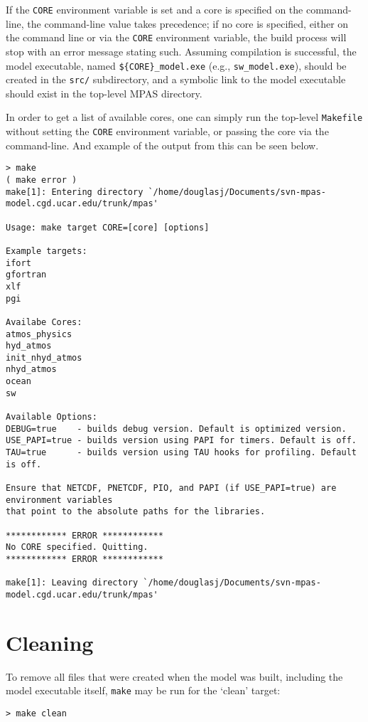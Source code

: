If the {\tt CORE} environment variable is set and a core is specified on the command-line, the command-line value takes precedence; if no core
is specified, either on the command line or via the {\tt CORE} environment variable, the build process will stop with an error message stating such.
Assuming compilation is successful, the model executable, named {\tt \$\{CORE\}\_model.exe} (e.g., {\tt sw\_model.exe}), should
be created in the {\tt src/} subdirectory, and a symbolic link to the model executable 
should exist in the top-level MPAS directory.

In order to get a list of available cores, one can simply run the top-level {\tt Makefile} without setting the {\tt CORE} environment variable, or passing the core via the command-line. And example of the output from this can be seen below.

{\small
\begin{verbatim}
> make
( make error )
make[1]: Entering directory `/home/douglasj/Documents/svn-mpas-model.cgd.ucar.edu/trunk/mpas'

Usage: make target CORE=[core] [options]

Example targets:
ifort
gfortran
xlf
pgi

Availabe Cores:
atmos_physics
hyd_atmos
init_nhyd_atmos
nhyd_atmos
ocean
sw

Available Options:
DEBUG=true    - builds debug version. Default is optimized version.
USE_PAPI=true - builds version using PAPI for timers. Default is off.
TAU=true      - builds version using TAU hooks for profiling. Default is off.

Ensure that NETCDF, PNETCDF, PIO, and PAPI (if USE_PAPI=true) are environment variables
that point to the absolute paths for the libraries.

************ ERROR ************
No CORE specified. Quitting.
************ ERROR ************

make[1]: Leaving directory `/home/douglasj/Documents/svn-mpas-model.cgd.ucar.edu/trunk/mpas'
\end{verbatim}
}

\section{Cleaning}

To remove all files  that were created when the model was built, including the model executable itself, {\tt make} may
be run for the `clean' target:

\vspace{12pt}
{\tt > make clean}
\vspace{12pt}


